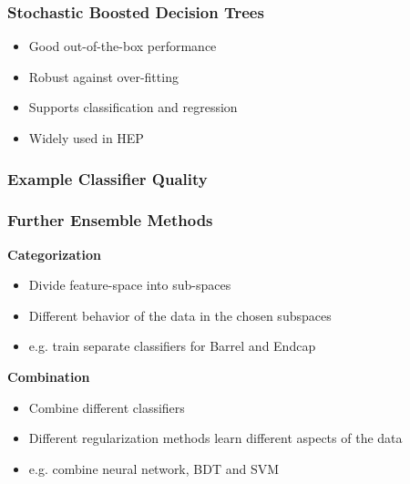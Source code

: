 \begin{frame}
    \frametitle{Stochastic Boosted Decision Trees}
    \begin{center}
      \begin{itemize}
        \item Good out-of-the-box performance
        \item Robust against over-fitting
        \item Supports classification and regression
        \item Widely used in HEP
      \end{itemize}
    \end{center}
\end{frame}

\begin{frame}
    \frametitle{Example Classifier Quality}
    \begin{center}
    \end{center}
\end{frame}

\begin{frame}
    \frametitle{Further Ensemble Methods}
    \begin{center}
      \textbf{Categorization}
      \begin{itemize}
        \item Divide feature-space into sub-spaces
        \item Different behavior of the data in the chosen subspaces
        \item e.g. train separate classifiers for Barrel and Endcap
      \end{itemize}




      \textbf{Combination}
      \begin{itemize}
        \item Combine different classifiers
        \item Different regularization methods learn different aspects of the data
        \item e.g. combine neural network, BDT and SVM
      \end{itemize}
    \end{center}
\end{frame}
